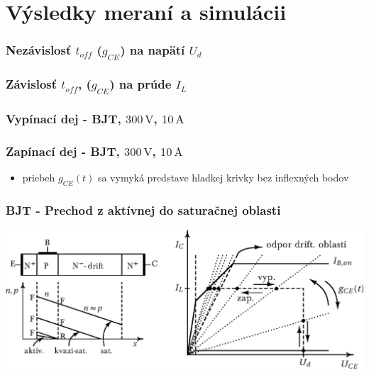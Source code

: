 \documentclass[oneside]{article}
\newcommand{\un}[1]{\, \mathrm{#1}}	%
\begin{document}
\newpage
{\centering \section{Výsledky meraní a simulácii} }


\centering

\subsubsection*{Nezávislosť $t_{off}$ ($g_{CE}$) na napätí $U_d$}


\subsubsection*{Závislosť $t_{off}$, ($g_{CE}$) na prúde $I_L$}


\subsubsection*{Vypínací dej - BJT, $300\un{V}$, $10\un{A}$}


\subsubsection*{Zapínací dej - BJT, $300\un{V}$, $10\un{A}$}
%

\begin{itemize}
    \item priebeh $g_{CE}(t)$ sa vymyká predstave hladkej krivky bez inflexných bodov
\end{itemize}

\newpage
\subsubsection*{BJT - Prechod z aktívnej do saturačnej oblasti}
{\centering \vspace{24pt} \includegraphics[width=\textwidth]{obr/oblasti} \par }
\end{document}
